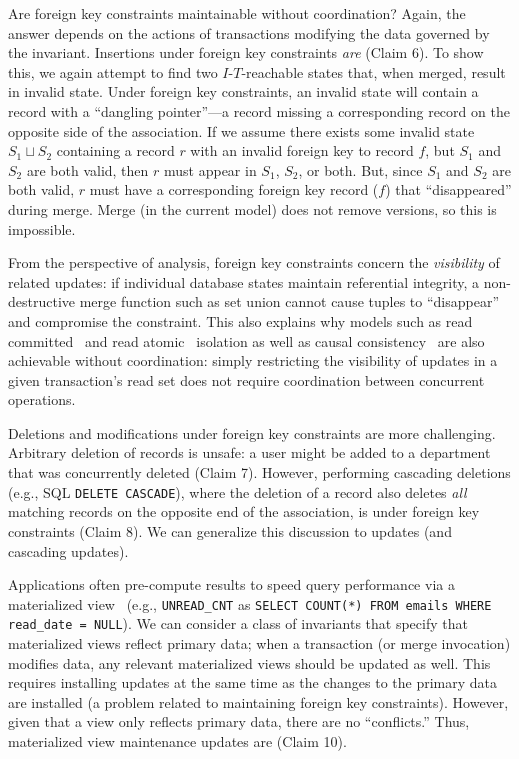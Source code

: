 Are foreign key constraints maintainable without coordination? Again,
the answer depends on the actions of transactions modifying the data
governed by the invariant. Insertions under foreign key constraints
\textit{are} \iconfluent (Claim 6). To show this, we again attempt to find two
$I$-$T$-reachable states that, when merged, result in invalid
state. Under foreign key constraints, an invalid state will contain a
record with a ``dangling pointer''---a record missing a corresponding
record on the opposite side of the association. If we assume there
exists some invalid state $S_1 \sqcup S_2$ containing a record $r$
with an invalid foreign key to record $f$, but $S_1$ and $S_2$ are
both valid, then $r$ must appear in $S_1$, $S_2$, or both. But, since
$S_1$ and $S_2$ are both valid, $r$ must have a corresponding foreign
key record ($f$) that ``disappeared'' during merge. Merge (in the
current model) does not remove versions, so this is impossible.

From the perspective of \iconfluence analysis, foreign key constraints
concern the \textit{visibility} of related updates: if individual
database states maintain referential integrity, a non-destructive
merge function such as set union cannot cause tuples to ``disappear''
and compromise the constraint. This also explains why models such as
read committed~\cite{adya} and read
atomic~\cite{adya} isolation as well as causal
consistency~\cite{hat-vldb} are also achievable without coordination:
simply restricting the visibility of updates in a given transaction's
read set does not require coordination between concurrent operations.

Deletions and modifications under foreign key constraints are more
challenging. Arbitrary deletion of records is unsafe: a user might be
added to a department that was concurrently deleted (Claim
7). However, performing cascading deletions (e.g., SQL \texttt{DELETE
  CASCADE}), where the deletion of a record also deletes \textit{all}
matching records on the opposite end of the association, is
\iconfluent under foreign key constraints (Claim 8). We can generalize
this discussion to updates (and cascading updates).

 Applications often pre-compute results
to speed query performance via a materialized view~\cite{tamer-book}
(e.g., \texttt{UNREAD\_CNT} as \texttt{SELECT}\texttt{
}\texttt{COUNT(*)}\texttt{ }\texttt{FROM}\texttt{
}\texttt{emails}\texttt{ }\texttt{WHERE}\texttt{ }\texttt{read\_date =
  NULL}). We can consider a class of invariants that specify that
materialized views reflect primary data; when a transaction (or merge
invocation) modifies data, any relevant materialized views should be
updated as well. This requires installing updates at the same time as
the changes to the primary data are installed (a problem related to
maintaining foreign key constraints). However, given that a view
only reflects primary data, there are no ``conflicts.'' Thus,
materialized view maintenance updates are \iconfluent (Claim 10).


